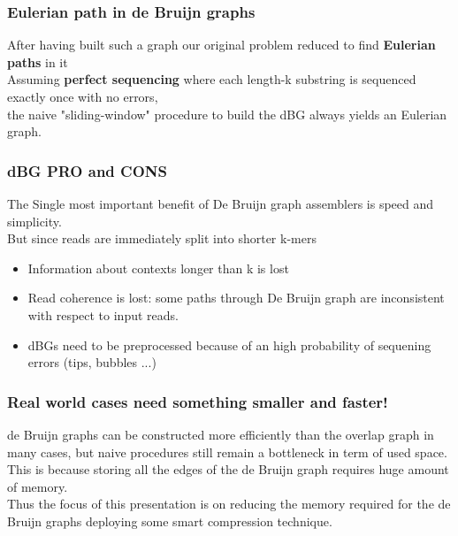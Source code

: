 
\begin{frame}
\frametitle{Eulerian path in de Bruijn graphs}
After having built such a graph our original problem reduced to find \textbf{Eulerian paths} in it
\\ \medskip
Assuming \textbf{perfect sequencing} where each length-k substring is sequenced exactly once with no errors,\\
the naive "sliding-window" procedure to build the dBG always yields an Eulerian graph.
\end{frame}

\begin{frame}
\frametitle{dBG PRO and CONS}
The Single most important benefit of De Bruijn graph assemblers is speed and simplicity.
\\ \medskip
But since reads are immediately split into shorter k-mers
\begin{itemize}
	\item Information about contexts longer than k is lost
	\item Read coherence is lost: some paths through De Bruijn graph are inconsistent with respect to input reads. \\
	\item dBGs need to be preprocessed because of an high probability of sequening errors (tips, bubbles ...)
\end{itemize}
\end{frame}

\begin{frame}
\frametitle{Real world cases need something smaller and faster!}
de Bruijn graphs can be constructed more efficiently than the overlap graph in many cases, but naive procedures still remain a bottleneck in term of used space.
\\ \medskip
This is because storing all the edges of the de Bruijn graph requires huge amount of memory.
\\ \medskip 
Thus the focus of this presentation is on reducing the memory required for the de Bruijn graphs deploying some smart compression technique.
\end{frame}
